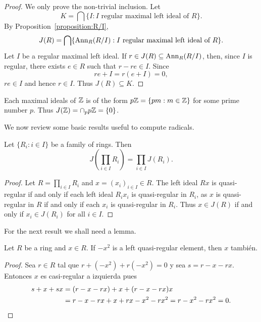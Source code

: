 \begin{proof}
    We only prove the non-trivial inclusion. 
	Let 
	\[
	K=\bigcap\{I:\text{$I$ regular maximal left ideal of $R$}\}.
	\]
	By
	Proposition~\ref{proposition:R/I}, 
	\[
		J(R)=\bigcap\{\operatorname{Ann}_R(R/I):I\text{ regular maximal left ideal of $R$}\}.
	\]
	Let $I$ be a regular maximal left ideal. If $r\in J(R)\subseteq
	\operatorname{Ann}_R(R/I)$, then, since $I$ is regular, there exists $e\in R$ such that
	$r-re\in I$. Since 
	\[
	re+I=r(e+I)=0,
	\]
	$re\in I$ and hence $r\in I$. Thus $J(R)\subseteq K$. 
\end{proof}

\begin{example}
	Each maximal ideals of $\mathbb{Z}$ is of the form $p\mathbb{Z}=\{pm:m\in\mathbb{Z}\}$ for some prime number $p$. 
	Thus $J(\mathbb{Z})=\cap_p p\mathbb{Z}=\{0\}$.
\end{example}


We now review some basic results useful to compute radicals. 

\begin{proposition}
	Let $\{R_i:i\in I\}$ be a family of rings. Then 
	\[
	J\left(\prod_{i\in I}R_i\right)=\prod_{i\in I}J(R_i).
	\]
\end{proposition}

\begin{proof}
	Let $R=\prod_{i\in I}R_i$ and $x=(x_i)_{i\in I}\in R$.  The left ideal 
    $Rx$ is quasi-regular if and only if each left ideal $R_ix_i$
	is quasi-regular in $R_i$, as $x$ is quasi-regular in $R$ if and only if each 
	$x_i$ is quasi-regular in $R_i$. Thus $x\in J(R)$ if and only if $x_i\in
	J(R_i)$ for all $i\in I$.
\end{proof}

For the next result we shall need a lemma.

\begin{lemma}
	\label{lemma:trickJ1}
	Let $R$ be a ring and $x\in R$. 
	If $-x^2$ is a left quasi-regular element, then $x$ también. 
\end{lemma}

\begin{proof}
	Sea $r\in R$ tal que $r+(-x^2)+r(-x^2)=0$ y sea $s=r-x-rx$. Entonces $x$ es
	casi-regular a izquierda pues 
	\begin{align*}
		s+x+sx&=(r-x-rx)+x+(r-x-rx)x\\
		&=r-x-rx+x+rx-x^2-rx^2=r-x^2-rx^2=0.\qedhere 
\end{align*}
\end{proof}

